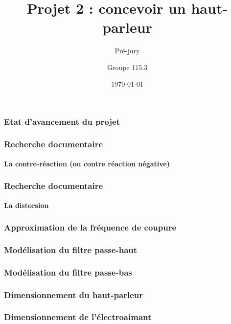 \documentclass[pdf]{beamer}
\title{Projet 2 : concevoir un haut-parleur}
\subtitle{Pré-jury}
\author{Groupe 115.3}
\date{\today}
\begin{document}
\begin{frame}
	\titlepage
\end{frame}

\begin{frame}
	\frametitle{Etat d'avancement du projet}	
\end{frame}

\begin{frame}
	\frametitle{Recherche documentaire}
	\framesubtitle{La contre-réaction (ou contre réaction négative)}
	
	
	
\end{frame}

\begin{frame}
	\frametitle{Recherche documentaire}
	\framesubtitle{La distorsion}
\end{frame}
	
\begin{frame}
	\frametitle{Approximation de la fréquence de coupure}
\end{frame}

\begin{frame}
	\frametitle{Modélisation du filtre passe-haut}
\end{frame}

\begin{frame}
	\frametitle{Modélisation du filtre passe-bas}
\end{frame}

\begin{frame}
	\frametitle{Dimensionnement du haut-parleur}
\end{frame}

\begin{frame}
	\frametitle{Dimensionnement de l'électroaimant}
\end{frame}
\end{document}

